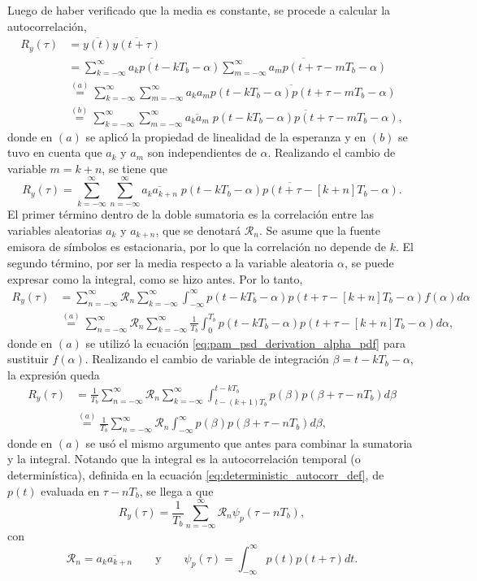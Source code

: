 \documentclass[a4paper]{article}
\begin{document}
Luego de haber verificado que la media es constante, se procede a calcular la autocorrelación,
\begin{align*}
 R_y(\tau) &= \overline{y(t)}\overline{y(t+\tau)}\\
   &= \overline{\sum_{k=-\infty}^{\infty}a_kp(t-kT_b-\alpha)}\overline{\sum_{m=-\infty}^{\infty}a_mp(t+\tau-mT_b-\alpha)}\\
   &\overset{(a)}{=}\sum_{k=-\infty}^{\infty}\sum_{m=-\infty}^{\infty}\overline{a_ka_mp(t-kT_b-\alpha)p(t+\tau-mT_b-\alpha)}\\
   &\overset{(b)}{=}\sum_{k=-\infty}^{\infty}\sum_{m=-\infty}^{\infty}\overline{a_ka_m}\;\overline{p(t-kT_b-\alpha)p(t+\tau-mT_b-\alpha)},
\end{align*}
donde en \((a)\) se aplicó la propiedad de linealidad de la esperanza y en \((b)\) se tuvo en cuenta que \(a_k\) y \(a_m\) son independientes de \(\alpha\). Realizando el cambio de variable \(m=k+n\), se tiene que
\[
 R_y(\tau) =\sum_{k=-\infty}^{\infty}\sum_{n=-\infty}^{\infty}\overline{a_ka_{k+n}}\;\overline{p(t-kT_b-\alpha)p(t+\tau-[k+n]T_b-\alpha)}.
\]
El primer término dentro de la doble sumatoria es la correlación entre las variables aleatorias \(a_k\) y \(a_{k+n}\), que se denotará \(\mathcal{R}_n\). Se asume que la fuente emisora de símbolos es estacionaria, por lo que la correlación no depende de \(k\). El segundo término, por ser la media respecto a la variable aleatoria \(\alpha\), se puede expresar como la integral, como se hizo antes. Por lo tanto,
\begin{align*}
 R_y(\tau) &=\sum_{n=-\infty}^{\infty}\mathcal{R}_n\sum_{k=-\infty}^{\infty}\int_{-\infty}^{\infty}p(t-kT_b-\alpha)p(t+\tau-[k+n]T_b-\alpha)f(\alpha)d\alpha\\
   &\overset{(a)}{=}\sum_{n=-\infty}^{\infty}\mathcal{R}_n\sum_{k=-\infty}^{\infty}\frac{1}{T_b}\int_{0}^{T_b}p(t-kT_b-\alpha)p(t+\tau-[k+n]T_b-\alpha)d\alpha,
\end{align*}
donde en \((a)\) se utilizó la ecuación \ref{eq:pam_psd_derivation_alpha_pdf} para sustituir \(f(\alpha)\). Realizando el cambio de variable de integración \(\beta=t-kT_b-\alpha\), la expresión queda
\begin{align*}
 R_y(\tau) &=\frac{1}{T_b}\sum_{n=-\infty}^{\infty}\mathcal{R}_n\sum_{k=-\infty}^{\infty}\int_{t-(k+1)T_b}^{t-kT_b}p(\beta)p(\beta+\tau-nT_b)d\beta\\
  &\overset{(a)}{=}\frac{1}{T_b}\sum_{n=-\infty}^{\infty}\mathcal{R}_n\int_{-\infty}^{\infty}p(\beta)p(\beta+\tau-nT_b)d\beta,
\end{align*}
donde en \((a)\) se usó el mismo argumento que antes para combinar la sumatoria y la integral. Notando que la integral es la autocorrelación temporal (o determinística), definida en la ecuación \ref{eq:deterministic_autocorr_def}, de \(p(t)\) evaluada en \(\tau-nT_b\), se llega a que
\begin{equation}\label{eq:pam_autocorrelation}
 R_y(\tau) =\frac{1}{T_b}\sum_{n=-\infty}^{\infty}\mathcal{R}_n\psi_p(\tau-nT_b),
\end{equation}
con
\[
 \mathcal{R}_n=\overline{a_ka_{k+n}}\qquad\textrm{y}\qquad \psi_p(\tau)=\int_{-\infty}^{\infty}p(t)p(t+\tau)dt.
\]
\end{document}

